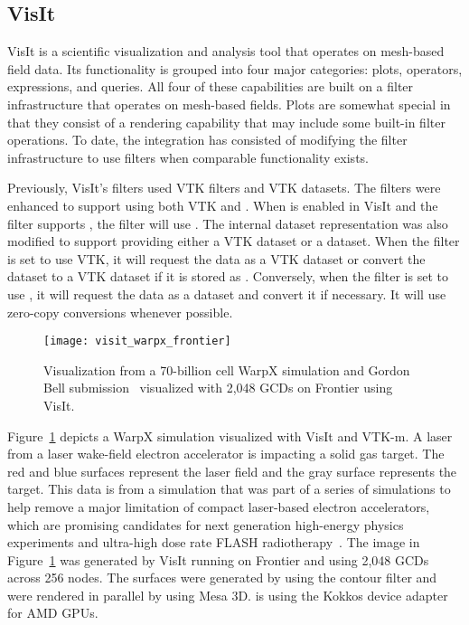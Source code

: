 \subsection{VisIt}

VisIt is a scientific visualization and analysis tool that operates on mesh-based field data.
Its functionality is grouped into four major categories: plots, operators, expressions, and queries.
All four of these capabilities are built on a filter infrastructure that operates on mesh-based fields.
Plots are somewhat special in that they consist of a rendering capability that may include some built-in filter operations.
To date, the \vtkm integration has consisted of modifying the filter infrastructure to use \vtkm filters when comparable \vtkm functionality exists.


Previously, VisIt's filters used VTK filters and VTK datasets.
The filters were enhanced to support using both VTK and \vtkm.
When \vtkm is enabled in VisIt and the filter supports \vtkm, the filter will use \vtkm.
The internal dataset representation was also modified to support providing either a VTK dataset or a \vtkm dataset.
When the filter is set to use VTK, it will request the data as a VTK dataset or convert the dataset to a VTK dataset if it is stored as \vtkm.
Conversely, when the filter is set to use \vtkm, it will request the data as a \vtkm dataset and convert it if necessary.
It will use zero-copy conversions whenever possible.

\begin{figure}[htb]
  \texttt{[image: visit\_warpx\_frontier]}
  \caption{Visualization from a 70-billion cell WarpX simulation and Gordon Bell submission~\citep{FedeliHuebl2022} visualized with 2,048 GCDs on Frontier using VisIt.}
  \label{fig:visit_warpx_frontier}
\end{figure}

Figure~\ref{fig:visit_warpx_frontier} depicts a WarpX simulation visualized with VisIt and VTK-m.
A laser from a laser wake-field electron accelerator is impacting a solid gas target.
The red and blue surfaces represent the laser field and the gray surface represents the target.
This data is from a simulation that was part of a series of simulations to help remove a major limitation of compact laser-based electron accelerators, which are promising candidates for next generation high-energy physics experiments and ultra-high dose rate FLASH radiotherapy~\citep{FedeliHuebl2022}.
The image in Figure~\ref{fig:visit_warpx_frontier} was generated by VisIt running on Frontier and using 2,048 GCDs across 256 nodes.
The surfaces were generated by using the \vtkm contour filter and were rendered in parallel by using Mesa 3D.
\vtkm is using the Kokkos device adapter for AMD GPUs.

